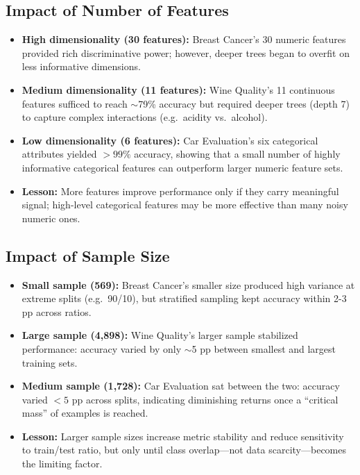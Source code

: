 \subsection{Impact of Number of Features}
\begin{itemize}
	\item \textbf{High dimensionality (30 features):}
	      Breast Cancer's 30 numeric features provided rich discriminative power; however, deeper trees began to overfit on less informative dimensions.
	\item \textbf{Medium dimensionality (11 features):}
	      Wine Quality's 11 continuous features sufficed to reach $\sim$79\% accuracy but required deeper trees (depth 7) to capture complex interactions (e.g.\ acidity vs.\ alcohol).
	\item \textbf{Low dimensionality (6 features):}
	      Car Evaluation's six categorical attributes yielded \(>99\%\) accuracy, showing that a small number of highly informative categorical features can outperform larger numeric feature sets.
	\item \textbf{Lesson:}
	      More features improve performance only if they carry meaningful signal; high-level categorical features may be more effective than many noisy numeric ones.
\end{itemize}

\subsection{Impact of Sample Size}
\begin{itemize}
	\item \textbf{Small sample (569):}
	      Breast Cancer's smaller size produced high variance at extreme splits (e.g.\ 90/10), but stratified sampling kept accuracy within 2-3 pp across ratios.
	\item \textbf{Large sample (4,898):}
	      Wine Quality's larger sample stabilized performance: accuracy varied by only $\sim$5 pp between smallest and largest training sets.
	\item \textbf{Medium sample (1,728):}
	      Car Evaluation sat between the two: accuracy varied \(<5\) pp across splits, indicating diminishing returns once a “critical mass” of examples is reached.
	\item \textbf{Lesson:}
	      Larger sample sizes increase metric stability and reduce sensitivity to train/test ratio, but only until class overlap—not data scarcity—becomes the limiting factor.
\end{itemize}

